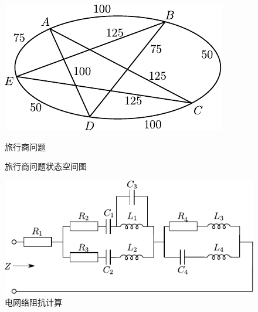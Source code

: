 	\begin{figure}[H]
		\centering
		\includegraphics[scale=.8]{figures/ques-2.3.pdf}
		\caption{旅行商问题} \label{Fig:TSP-problem}
		\vspace{1cm}
		
		\caption{旅行商问题状态空间图} \label{Fig:TSP-answer}
		\vspace{1cm}
		\includegraphics{figures/ques-2.4.pdf}
		\caption{电网络阻抗计算} \label{Fig:elec}
	\end{figure}
	
